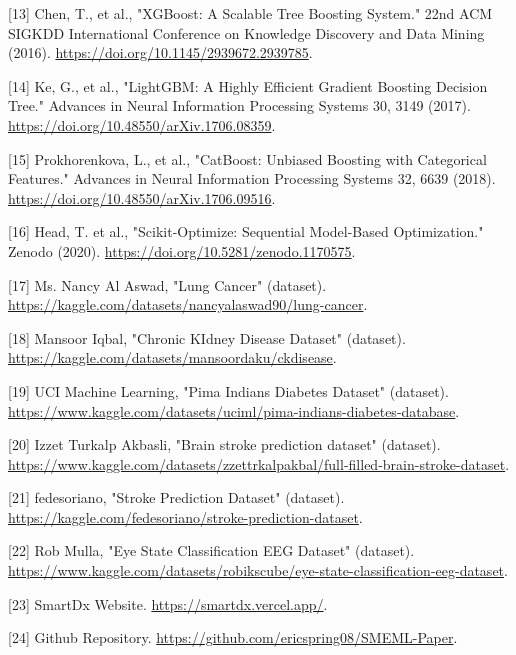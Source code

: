 \documentclass{article}
\begin{document}
{[13] Chen, T., et al., "XGBoost: A Scalable Tree Boosting System." 22nd ACM SIGKDD International Conference on Knowledge Discovery and Data Mining (2016). \url{https://doi.org/10.1145/2939672.2939785}.

[14] Ke, G., et al., "LightGBM: A Highly Efficient Gradient Boosting Decision Tree." Advances in Neural Information Processing Systems 30, 3149 (2017). \url{https://doi.org/10.48550/arXiv.1706.08359}.

[15] Prokhorenkova, L., et al., "CatBoost: Unbiased Boosting with Categorical Features." Advances in Neural Information Processing Systems 32, 6639 (2018). \url{https://doi.org/10.48550/arXiv.1706.09516}.

[16] Head, T. et al., "Scikit-Optimize: Sequential Model-Based Optimization." Zenodo (2020). \url{https://doi.org/10.5281/zenodo.1170575}.

[17] Ms. Nancy Al Aswad, "Lung Cancer" (dataset). \url{https://kaggle.com/datasets/nancyalaswad90/lung-cancer}.

[18] Mansoor Iqbal, "Chronic KIdney Disease Dataset" (dataset). \url{https://kaggle.com/datasets/mansoordaku/ckdisease}.

[19] UCI Machine Learning, "Pima Indians Diabetes Dataset" (dataset). \url{https://www.kaggle.com/datasets/uciml/pima-indians-diabetes-database}.

[20] Izzet Turkalp Akbasli, "Brain stroke prediction dataset" (dataset). \url{https://www.kaggle.com/datasets/zzettrkalpakbal/full-filled-brain-stroke-dataset}.

[21] fedesoriano, "Stroke Prediction Dataset" (dataset). \url{https://kaggle.com/fedesoriano/stroke-prediction-dataset}.

[22] Rob Mulla, "Eye State Classification EEG Dataset" (dataset). \url{https://www.kaggle.com/datasets/robikscube/eye-state-classification-eeg-dataset}.

[23] SmartDx Website. \url{https://smartdx.vercel.app/}.

[24] Github Repository. \url{https://github.com/ericspring08/SMEML-Paper}.
}
\end{document}
